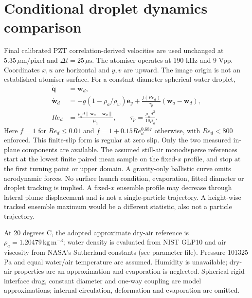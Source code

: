 \section{Conditional droplet dynamics comparison}
Final calibrated PZT correlation-derived velocities are used unchanged at
$5.35\,\mu\mathrm{m/pixel}$ and $\Delta t=25\,\mu\mathrm{s}$.
The atomiser operates at 190 kHz and 9 Vpp. Coordinates $x,u$ are horizontal
and $y,v$ are upward. The image origin is not an established atomiser surface.
For a constant-diameter spherical water droplet,
\begin{align}
\dot{\boldsymbol q}&=\boldsymbol w_d,\\
\dot{\boldsymbol w}_d&=-g(1-\rho_a/\rho_w)\boldsymbol e_y+
\frac{f(Re_d)}{\tau_p}(\boldsymbol w_a-\boldsymbol w_d),\\
Re_d&=\frac{\rho_a d\lVert\boldsymbol w_a-\boldsymbol w_d\rVert}{\mu_a},
\qquad \tau_p=\frac{\rho_w d^2}{18\mu_a}.
\end{align}
Here $f=1$ for $Re_d\leq0.01$ and $f=1+0.15Re_d^{0.687}$ otherwise,
with $Re_d<800$ enforced. This finite-slip form is regular at zero slip.
Only the two measured in-plane components are available.
The assumed still-air monodisperse references start at the lowest finite
paired mean sample on the fixed-$x$ profile, and stop at the first turning
point or upper domain. A gravity-only ballistic curve omits aerodynamic forces.
No surface launch condition, evaporation, fitted diameter or droplet tracking
is implied. A fixed-$x$ ensemble profile may decrease through lateral plume
displacement and is not a single-particle trajectory. A height-wise tracked
ensemble maximum would be a different statistic, also not a particle trajectory.

At 20 degrees C, the adopted approximate dry-air reference is
$\rho_a=1.20479\,\mathrm{kg\,m^{-3}}$; water density is evaluated from NIST
GLP10 and air viscosity from NASA's Sutherland constants (see parameter file).
Pressure 101325 Pa and equal water/air temperature are assumed. Humidity is unavailable; dry-air properties are an approximation and evaporation is neglected.
Spherical rigid-interface drag, constant diameter and one-way coupling are
model approximations; internal circulation, deformation and evaporation are omitted.

